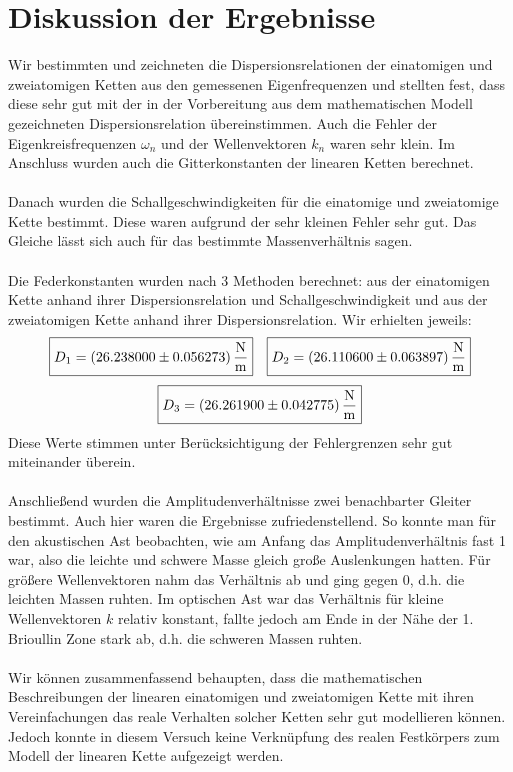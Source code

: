 \documentclass[a4paper,titlepage]{scrartcl}
\numberwithin{equation}{section}
\begin{document}
\section{Diskussion der Ergebnisse}
Wir bestimmten und zeichneten die Dispersionsrelationen der einatomigen und zweiatomigen Ketten aus den gemessenen Eigenfrequenzen und stellten fest, dass diese sehr gut mit der in der Vorbereitung aus dem mathematischen Modell gezeichneten Dispersionsrelation übereinstimmen. Auch die Fehler der Eigenkreisfrequenzen $\omega_n$ und der Wellenvektoren $k_n$ waren sehr klein. Im Anschluss wurden auch die Gitterkonstanten der linearen Ketten berechnet.\\ \\
Danach wurden die Schallgeschwindigkeiten für die einatomige und zweiatomige Kette bestimmt. Diese waren aufgrund der sehr kleinen Fehler sehr gut. Das Gleiche lässt sich auch für das bestimmte Massenverhältnis sagen.\\ \\
Die Federkonstanten wurden nach 3 Methoden berechnet: aus der einatomigen Kette anhand ihrer Dispersionsrelation und Schallgeschwindigkeit und aus der zweiatomigen Kette anhand ihrer Dispersionsrelation. Wir erhielten jeweils:
\begin{equation*}
\boxed{D_1=\unit[(26.238000 \pm 0.056273)]{\frac{N}{m}}} \quad \boxed{D_2=\unit[(26.110600 \pm 0.063897)]{\frac{N}{m}}}
\end{equation*}
\begin{equation*}
\boxed{D_3=\unit[(26.261900 \pm 0.042775)]{\frac{N}{m}}}
\end{equation*}
Diese Werte stimmen unter Berücksichtigung der Fehlergrenzen sehr gut miteinander überein.\\ \\
Anschließend wurden die Amplitudenverhältnisse zwei benachbarter Gleiter bestimmt. Auch hier waren die Ergebnisse zufriedenstellend. So konnte man für den akustischen Ast beobachten, wie am Anfang das Amplitudenverhältnis fast 1 war, also die leichte und schwere Masse gleich große Auslenkungen hatten. Für größere Wellenvektoren nahm das Verhältnis ab und ging gegen 0, d.h. die leichten Massen ruhten. Im optischen Ast war das Verhältnis für kleine Wellenvektoren $k$ relativ konstant, fallte jedoch am Ende in der Nähe der 1. Brioullin Zone stark ab, d.h. die schweren Massen ruhten.\\ \\
Wir können zusammenfassend behaupten, dass die mathematischen Beschreibungen der linearen einatomigen und zweiatomigen Kette mit ihren Vereinfachungen das reale Verhalten solcher Ketten sehr gut modellieren können. Jedoch konnte in diesem Versuch keine Verknüpfung des realen Festkörpers zum Modell der linearen Kette aufgezeigt werden.


\end{document}
